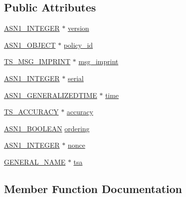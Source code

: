 \subsection*{Public Attributes}
\begin{DoxyCompactItemize}
\item 
\hyperlink{ossl__typ_8h_af4335399bf9774cb410a5e93de65998b}{A\+S\+N1\+\_\+\+I\+N\+T\+E\+G\+ER} $\ast$ \hyperlink{struct_t_s__tst__info__st_ad0e7ab1536c6e4ecae58bc6f0538b4dc}{version}
\item 
\hyperlink{asn1_8h_ae10c08e4e6b23f67a39b2add932ec48f}{A\+S\+N1\+\_\+\+O\+B\+J\+E\+CT} $\ast$ \hyperlink{struct_t_s__tst__info__st_a59787f93711b76c27283f254d4a767b3}{policy\+\_\+id}
\item 
\hyperlink{ts_8h_a22e456a55112f85239a13f8f741d87f3}{T\+S\+\_\+\+M\+S\+G\+\_\+\+I\+M\+P\+R\+I\+NT} $\ast$ \hyperlink{struct_t_s__tst__info__st_adae22a923e0d2be1b9b42a1b65ad6421}{msg\+\_\+imprint}
\item 
\hyperlink{ossl__typ_8h_af4335399bf9774cb410a5e93de65998b}{A\+S\+N1\+\_\+\+I\+N\+T\+E\+G\+ER} $\ast$ \hyperlink{struct_t_s__tst__info__st_ab450625d8b03f76e3382e5f3b6a35896}{serial}
\item 
\hyperlink{ossl__typ_8h_abd19ea5b527807ce3a516e6a41440f84}{A\+S\+N1\+\_\+\+G\+E\+N\+E\+R\+A\+L\+I\+Z\+E\+D\+T\+I\+ME} $\ast$ \hyperlink{struct_t_s__tst__info__st_a8b6a1201796f7e1b5b961ee86ab55681}{time}
\item 
\hyperlink{ts_8h_a85472dd127e577a5d020a1ad337c8b94}{T\+S\+\_\+\+A\+C\+C\+U\+R\+A\+CY} $\ast$ \hyperlink{struct_t_s__tst__info__st_a4ffba57649f2c0e48348a2c2894de46b}{accuracy}
\item 
\hyperlink{ossl__typ_8h_abab3d5c6a3b9e049d27737dc227c0849}{A\+S\+N1\+\_\+\+B\+O\+O\+L\+E\+AN} \hyperlink{struct_t_s__tst__info__st_a4410b2d0d0f5ebc631a41804c0a92ad8}{ordering}
\item 
\hyperlink{ossl__typ_8h_af4335399bf9774cb410a5e93de65998b}{A\+S\+N1\+\_\+\+I\+N\+T\+E\+G\+ER} $\ast$ \hyperlink{struct_t_s__tst__info__st_af2de206a30ac43b6c0048e1b78774ca4}{nonce}
\item 
\hyperlink{x509v3_8h_a6688fb8a0c7b8e63f3d47bac3a09eb15}{G\+E\+N\+E\+R\+A\+L\+\_\+\+N\+A\+ME} $\ast$ \hyperlink{struct_t_s__tst__info__st_aa4b23c96f4a2a053c56b46f7622a4a2c}{tsa}
\end{DoxyCompactItemize}


\subsection{Member Function Documentation}
